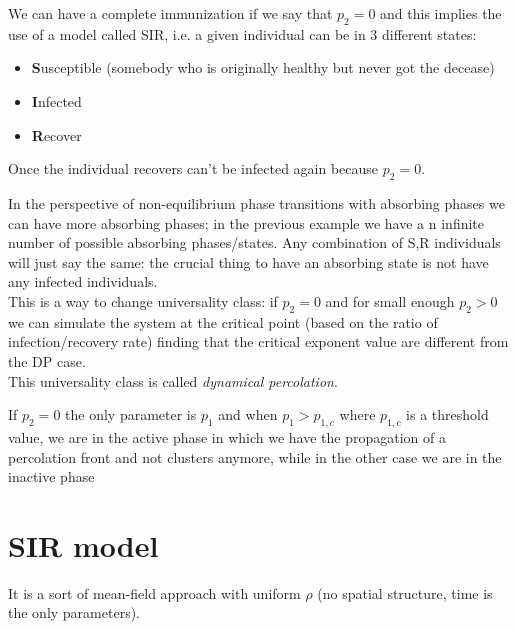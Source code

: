 \documentclass[\main/main.tex]{subfiles}
\begin{document}
We can have a complete immunization if we say that $p_2=0$ and this implies the use of a model called SIR, i.e. a given individual can be in 3 different states:
\begin{itemize}
    \item \textbf{S}usceptible (somebody who is originally healthy but never got the decease)
    \item \textbf{I}nfected 
    \item \textbf{R}ecover
\end{itemize}
Once the individual recovers can't be infected again because $p_2=0$.

In the perspective of non-equilibrium phase transitions with absorbing phases we can have more absorbing phases; in the previous example we have a n infinite number of possible absorbing phases/states. Any combination of S,R individuals will just say the same: the crucial thing to have an absorbing state is not have any infected individuals. \\

This is a way to change universality class: if $p_2=0$ and for small enough $p_2>0$ we can simulate the system at the critical point (based on the ratio of infection/recovery rate) finding that the critical exponent value are different from the DP case. \\

This universality class is called \textit{dynamical percolation}.

If $p_2=0$ the only parameter is $p_1$ and when $p_1>p_{1,c}$ where $p_{1,c}$ is a threshold value, we are in the active phase in which we have the propagation of a percolation front and not clusters anymore, while in the other case we are in the inactive phase

\section{SIR model}
It is a sort of mean-field approach with uniform $\rho$ (no spatial structure, time is the only parameters).
\end{document}
